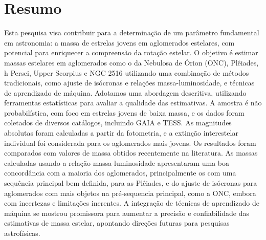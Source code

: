 %
%

\section{\textbf{Resumo}}
  Esta pesquisa visa contribuir para a determinação de um parâmetro fundamental em astronomia: a massa de estrelas jovens em aglomerados estelares, com potencial para enriquecer a compreensão da rotação estelar. O objetivo é estimar massas estelares em aglomerados como o da Nebulosa de Órion (ONC), Plêiades, h Persei, Upper Scorpius e NGC 2516 utilizando uma combinação de métodos tradicionais, como ajuste de isócronas e relações massa-luminosidade, e técnicas de aprendizado de máquina. Adotamos uma abordagem descritiva, utilizando ferramentas estatísticas para avaliar a qualidade das estimativas. A amostra é não probabilística, com foco em estrelas jovens de baixa massa, e os dados foram coletados de diversos catálogos, incluindo GAIA e TESS. As magnitudes absolutas foram calculadas a partir da fotometria, e a extinção interestelar individual foi considerada para os aglomerados mais jovens. Os resultados foram comparados com valores de massa obtidos recentemente na literatura. As massas calculadas usando a relação massa-luminosidade apresentaram uma boa concordância com a maioria dos aglomerados, principalmente os com uma sequência principal bem definida, para as Plêiades, e do ajuste de isócronas para aglomerados com mais objetos na pré-sequencia principal, como a ONC, embora com incertezas e limitações inerentes. A integração de técnicas de aprendizado de máquina se mostrou promissora para aumentar a precisão e confiabilidade das estimativas de massa estelar, apontando direções futuras para pesquisas astrofísicas.
